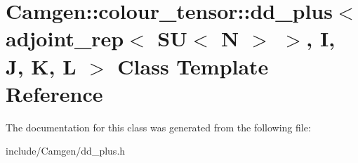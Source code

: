 \hypertarget{a00122}{}\section{Camgen\+:\+:colour\+\_\+tensor\+:\+:dd\+\_\+plus$<$ adjoint\+\_\+rep$<$ S\+U$<$ N $>$ $>$, I, J, K, L $>$ Class Template Reference}
\label{a00122}


The documentation for this class was generated from the following file\+:\begin{DoxyCompactItemize}
\item 
include/\+Camgen/dd\+\_\+plus.\+h\end{DoxyCompactItemize}
